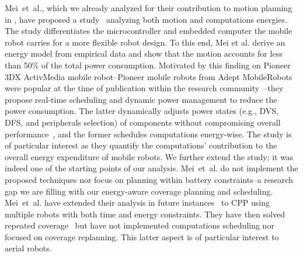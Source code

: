 Mei~et~al., which we already analyzed for their contribution to motion planning in , have proposed a study~\citep{mei2005case} analyzing both motion and computations energies. The study differentiates the microcontroller and embedded computer the mobile robot carries for a more flexible robot design. To this end, Mei et al. derive an energy model from empirical data and show that the motion accounts for less than 50\% of the total power consumption. Motivated by this finding on Pioneer 3DX ActivMedia mobile robot--Pioneer mobile robots from Adept MobileRobots were popular at the time of publication within the research community~\citep{erickson2003nonlearning,anguelov2004detecting,lemmay2004autonomous}--they propose real-time scheduling and dynamic power management to reduce the power consumption. The latter dynamically adjusts power states (e.g., DVS, DFS, and peripherals selection) of components without compromising overall performance~\citep{mei2005case}, and the former schedules computations energy-wise. The study is of particular interest as they quantify the computations' contribution to the overall energy expenditure of mobile robots. We further extend the study; it was indeed one of the starting points of our analysis. Mei~et~al. do not implement the proposed techniques nor focus on planning within battery constraints--a research gap we are filling with our energy-aware coverage planning and scheduling. Mei~et~al. have extended their analysis in future instances~\citep{mei2006deployment,mei2005reducing,mei2005deployment} to CPP using multiple robots with both time and energy constraints. They have then solved repeated coverage~\citep{mei2006energy} but have not implemented computations scheduling nor focused on coverage replanning. This latter aspect is of particular interest to aerial robots.

